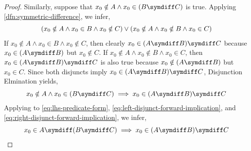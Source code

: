 \begin{proof}
    \vspace{0.1cm}
    \noindent Similarly, suppose that \( x_{0} \notin A \land x_{0} \in \mleft( B \symdiff C \mright) \) is true.
    Applying \cref{dfn:symmetric-difference}, we infer,
    \begin{equation*}
        \mleft( x_{0} \notin A \land x_{0} \in B \land x_{0} \notin C \mright)
        \lor
        \mleft( x_{0} \notin A \land x_{0} \notin B \land x_{0} \in C \mright)
    \end{equation*}
    If \( x_{0} \notin A \land x_{0} \in B \land x_{0} \notin C \),
    then clearly \( x_{0} \in \mleft( A \symdiff B \mright) \symdiff C \) because
    \( x_{0} \in \mleft( A \symdiff B \mright) \) but \( x_{0} \notin C \).
    If \( x_{0} \notin A \land x_{0} \notin B \land x_{0} \in C \),
    then \( x_{0} \in \mleft( A \symdiff B \mright) \symdiff C \) is also true because
    \( x_{0} \notin \mleft( A \symdiff B \mright) \) but \( x_{0} \in C \). Since both disjuncts
    imply \( x_{0} \in \mleft( A \symdiff B \mright) \symdiff C \), Disjunction Elmination
    yields,
    \begin{equation}
        \label{eq:right-disjunct-forward-implication}
        x_{0} \notin A \land x_{0} \in \mleft( B \symdiff C \mright)
        \implies
        x_{0} \in \mleft( A \symdiff B \mright) \symdiff C
    \end{equation}
    Applying  to \eqref{eq:lhs-predicate-form}, \eqref{eq:left-disjunct-forward-implication},
    and \eqref{eq:right-disjunct-forward-implication}, we infer,
    \begin{equation}
        \label{eq:symmetric-difference-associativity-forward-implication}
        x_{0} \in A \symdiff \mleft( B \symdiff C \mright)
        \implies
        x_{0} \in \mleft( A \symdiff B \mright) \symdiff C
    \end{equation}


\end{proof}
